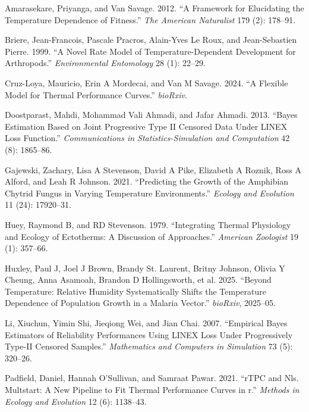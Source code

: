 \documentclass[
]{article}
\newlength{\cslhangindent}
\newenvironment{CSLReferences}[2] %
 {\begin{list}{}{%
  \setlength{\itemindent}{0pt}
  \setlength{\leftmargin}{0pt}
  \setlength{\parsep}{0pt}
  \ifodd #1
   \setlength{\leftmargin}{\cslhangindent}
   \setlength{\itemindent}{-1\cslhangindent}
  \fi
  \setlength{\itemsep}{#2\baselineskip}}}
 {\end{list}}
\begin{document}
\label{refs}
\begin{CSLReferences}{1}{0}
Amarasekare, Priyanga, and Van Savage. 2012. {``A Framework for
Elucidating the Temperature Dependence of Fitness.''} \emph{The American
Naturalist} 179 (2): 178--91.

Briere, Jean-Francois, Pascale Pracros, Alain-Yves Le Roux, and
Jean-Sebastien Pierre. 1999. {``A Novel Rate Model of
Temperature-Dependent Development for Arthropods.''} \emph{Environmental
Entomology} 28 (1): 22--29.

Cruz-Loya, Mauricio, Erin A Mordecai, and Van M Savage. 2024. {``A
Flexible Model for Thermal Performance Curves.''} \emph{bioRxiv}.

Doostparast, Mahdi, Mohammad Vali Ahmadi, and Jafar Ahmadi. 2013.
{``Bayes Estimation Based on Joint Progressive Type II Censored Data
Under LINEX Loss Function.''} \emph{Communications in
Statistics-Simulation and Computation} 42 (8): 1865--86.

Gajewski, Zachary, Lisa A Stevenson, David A Pike, Elizabeth A Roznik,
Ross A Alford, and Leah R Johnson. 2021. {``Predicting the Growth of the
Amphibian Chytrid Fungus in Varying Temperature Environments.''}
\emph{Ecology and Evolution} 11 (24): 17920--31.

Huey, Raymond B, and RD Stevenson. 1979. {``Integrating Thermal
Physiology and Ecology of Ectotherms: A Discussion of Approaches.''}
\emph{American Zoologist} 19 (1): 357--66.

Huxley, Paul J, Joel J Brown, Brandy St. Laurent, Britny Johnson, Olivia
Y Cheung, Anna Asamoah, Brandon D Hollingsworth, et al. 2025. {``Beyond
Temperature: Relative Humidity Systematically Shifts the Temperature
Dependence of Population Growth in a Malaria Vector.''} \emph{bioRxiv},
2025--05.

Li, Xiuchun, Yimin Shi, Jieqiong Wei, and Jian Chai. 2007. {``Empirical
Bayes Estimators of Reliability Performances Using LINEX Loss Under
Progressively Type-II Censored Samples.''} \emph{Mathematics and
Computers in Simulation} 73 (5): 320--26.

Padfield, Daniel, Hannah O'Sullivan, and Samraat Pawar. 2021. {``rTPC
and Nls. Multstart: A New Pipeline to Fit Thermal Performance Curves in
r.''} \emph{Methods in Ecology and Evolution} 12 (6): 1138--43.


\end{CSLReferences}
\end{document}
